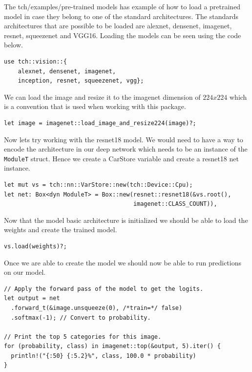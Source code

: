 \documentclass{book}
\begin{document}
The tch/examples/pre-trained models has example of how to load a pretrained model in case they belong to one of the standard architectures. The standards architectures that are possible to be loaded are alexnet, densenet, imagenet, resnet, squeezenet and VGG16. Loading the models can be seen using the code below.

\begin{lstlisting}[caption={https://github.com/LaurentMazare/tch-rs/blob/master/examples/pretrained-models/main.rs}, basicstyle=\small]
use tch::vision::{
	alexnet, densenet, imagenet,
	inception, resnet, squeezenet, vgg};
\end{lstlisting}

We can load the image and resize it to the imagenet dimension of $224x224$ which is a convention that is used when working with this package.

\begin{lstlisting}[caption={https://github.com/LaurentMazare/tch-rs/blob/master/examples/pretrained-models/main.rs}, basicstyle=\small]
let image = imagenet::load_image_and_resize224(image)?;
\end{lstlisting}

Now lets try working with the resnet18 model. We would need to have a way to encode the architecture in our deep network which needs to be an instance of the \lstinline{ModuleT} struct. Hence we create a CarStore variable and create a resnet18 net instance.

\begin{lstlisting}[caption={https://github.com/LaurentMazare/tch-rs/blob/master/examples/pretrained-models/main.rs}, basicstyle=\small]
let mut vs = tch::nn::VarStore::new(tch::Device::Cpu);
let net: Box<dyn ModuleT> = Box::new(resnet::resnet18(&vs.root(),
                                     imagenet::CLASS_COUNT)),
\end{lstlisting}

Now that the model basic architecture is initialized we should be able to load the weights and create the trained model.

\begin{lstlisting}[caption={https://github.com/LaurentMazare/tch-rs/blob/master/examples/pretrained-models/main.rs}, basicstyle=\small]
vs.load(weights)?;
\end{lstlisting}

Once we are able to create the model we should now be able to run predictions on our model.

\begin{lstlisting}[caption={https://github.com/LaurentMazare/tch-rs/blob/master/examples/pretrained-models/main.rs}, basicstyle=\small]
// Apply the forward pass of the model to get the logits.
let output = net
  .forward_t(&image.unsqueeze(0), /*train=*/ false)
  .softmax(-1); // Convert to probability.

// Print the top 5 categories for this image.
for (probability, class) in imagenet::top(&output, 5).iter() {
  println!("{:50} {:5.2}%", class, 100.0 * probability)
}
\end{lstlisting}
\end{document}
